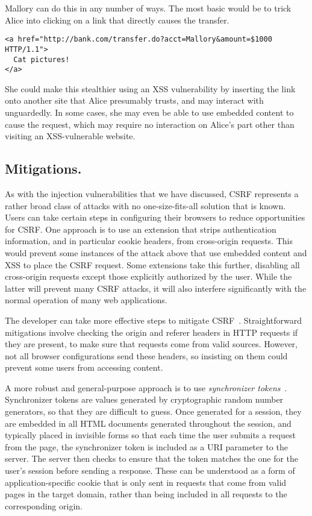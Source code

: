 \documentclass[11pt,twoside]{scrartcl}
\begin{document}
Mallory can do this in any number of ways. The most basic would be to trick Alice into clicking on a link that directly causes the transfer.
\begin{verbatim}
<a href="http://bank.com/transfer.do?acct=Mallory&amount=$1000 HTTP/1.1">
  Cat pictures!
</a>
\end{verbatim}
She could make this stealthier using an XSS vulnerability by inserting the link onto another site that Alice presumably trusts, and may interact with unguardedly. In some cases, she may even be able to use embedded content to cause the request, which may require no interaction on Alice's part other than visiting an XSS-vulnerable website.

\subsection{Mitigations.} As with the injection vulnerabilities that we have discussed, CSRF represents a rather broad class of attacks with no one-size-fits-all solution that is known. Users can take certain steps in configuring their browsers to reduce opportunities for CSRF. One approach is to use an extension that strips authentication information, and in particular cookie headers, from cross-origin requests. This would prevent some instances of the attack above that use embedded content and XSS to place the CSRF request. Some extensions take this further, disabling all cross-origin requests except those  explicitly authorized by the user. While the latter will prevent many CSRF attacks, it will also interfere significantly with the normal operation of many web applications.

The developer can take more effective steps to mitigate CSRF~\cite{csrfmitigation}. Straightforward mitigations involve checking the origin and referer headers in HTTP requests if they are present, to make sure that requests come from valid sources. However, not all browser configurations send these headers, so insisting on them could prevent some users from accessing content.

A more robust and general-purpose approach is to use \emph{synchronizer tokens}~\cite{csrfmitigation}. Synchronizer tokens are values generated by cryptographic random number generators, so that they are difficult to guess. Once generated for a session, they are embedded in all HTML documents generated throughout the session, and typically placed in invisible forms so that each time the user submits a request from the page, the synchronizer token is included as a URI parameter to the server. The server then checks to ensure that the token matches the one for the user's session before sending a response. These can be understood as a form of application-specific cookie that is only sent in requests that come from valid pages in the target domain, rather than being included in all requests to the corresponding origin.



\end{document}
